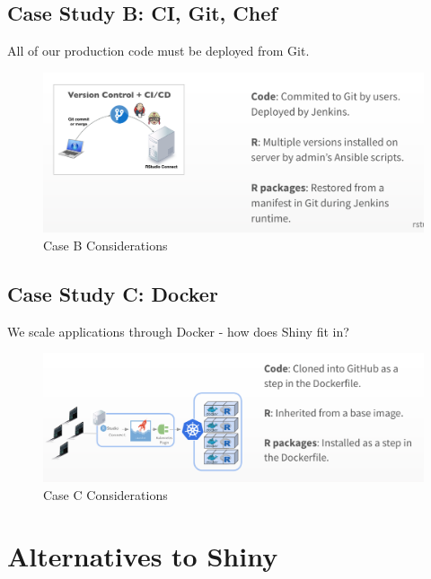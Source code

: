 \documentclass[]{book}
\theoremstyle{definition}
\theoremstyle{definition}
\theoremstyle{definition}
\theoremstyle{remark}
\begin{document}
\hypertarget{case-study-b-ci-git-chef}{%
\section{Case Study B: CI, Git, Chef}\label{case-study-b-ci-git-chef}}

All of our production code must be deployed from Git.

\begin{figure}
\centering
\includegraphics{imgs/case-studies/case-b.png}
\caption{Case B Considerations}
\end{figure}

\hypertarget{case-study-c-docker}{%
\section{Case Study C: Docker}\label{case-study-c-docker}}

We scale applications through Docker - how does Shiny fit in?

\begin{figure}
\centering
\includegraphics{imgs/case-studies/case-c.png}
\caption{Case C Considerations}
\end{figure}

\hypertarget{alternatives-to-shiny}{%
\chapter{Alternatives to Shiny}\label{alternatives-to-shiny}}
\end{document}
